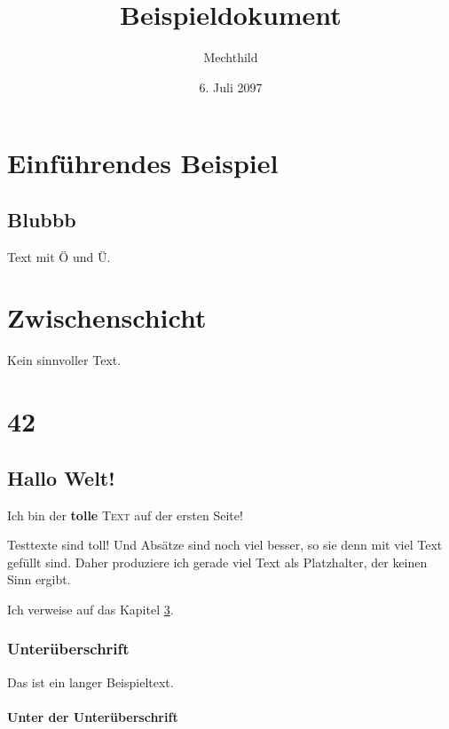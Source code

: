 \documentclass[]{scrreprt}
\author{Mechthild}
\title{Beispieldokument}
\date{6. Juli 2097}
\begin{document}
\maketitle %

\tableofcontents %

\listoffigures %

\chapter{Einführendes Beispiel}

\section{Blubbb}

Text mit Ö und Ü.

\chapter{Zwischenschicht}

Kein sinnvoller Text.


\chapter{42}
\label{ch:42}



\section{Hallo Welt!}
\tiny
Ich bin der \textbf{tolle} \textsc{Text} auf der ersten Seite! 
\normalsize

Testtexte sind toll! Und Absätze sind noch viel besser, so sie denn mit viel Text gefüllt sind. Daher produziere ich gerade viel Text als Platzhalter, der keinen Sinn ergibt.

Ich verweise auf das Kapitel \ref{ch:42}.

\subsection{Unterüberschrift}

Das ist ein langer Beispieltext.

\subsubsection{Unter der Unterüberschrift}
\end{document}
